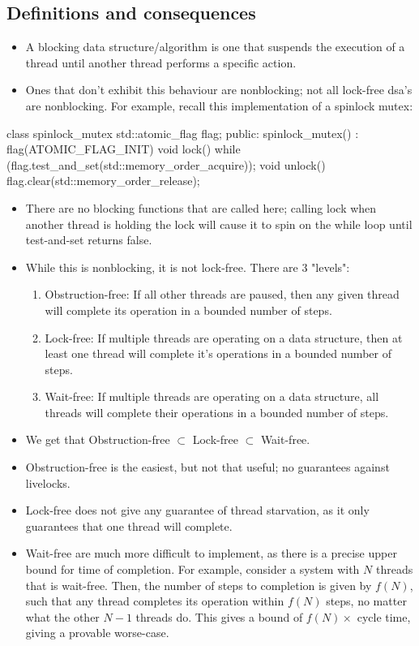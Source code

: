 \documentclass[11pt, a4paper]{article}
\theoremstyle{definition}
\theoremstyle{remark}
\begin{document}
\subsection{Definitions and consequences}
\begin{itemize}
    \item A blocking data structure/algorithm is one that suspends the execution of a thread until another thread performs a specific action.
    \item Ones that don't exhibit this behaviour are nonblocking; not all lock-free dsa's are nonblocking. For example, recall this implementation of a spinlock mutex:
\end{itemize}
\begin{cppcode}
class spinlock_mutex {
    std::atomic_flag flag;
public:
    spinlock_mutex() : flag(ATOMIC_FLAG_INIT) {}
    void lock() {
        while (flag.test_and_set(std::memory_order_acquire));
    }
    void unlock() {
        flag.clear(std::memory_order_release);
    }
}
\end{cppcode}
\begin{itemize}
    \item There are no blocking functions that are called here; calling lock when another thread is holding the lock will cause it to spin on the while loop until test-and-set returns false.
    \item While this is nonblocking, it is not lock-free. There are 3 "levels":
    \begin{enumerate}
        \item Obstruction-free: If all other threads are paused, then any given thread will complete its operation in a bounded number of steps.
        \item Lock-free: If multiple threads are operating on a data structure, then at least one thread will complete it's operations in a bounded number of steps.
        \item Wait-free: If multiple threads are operating on a data structure, all threads will complete their operations in a bounded number of steps.
    \end{enumerate}
        \item We get that Obstruction-free $\subset$ Lock-free $\subset$ Wait-free.
        \item Obstruction-free is the easiest, but not that useful; no guarantees against livelocks.
        \item Lock-free does not give any guarantee of thread starvation, as it only guarantees that one thread will complete.
        \item Wait-free are much more difficult to implement, as there is a precise upper bound for time of completion. For example, consider a system with $N$ threads that is wait-free. Then, the number of steps to completion is given by $f(N)$, such that any thread completes its operation within $f(N)$ steps, no matter what the other $N-1$ threads do. This gives a bound of $f(N) \times $ cycle time, giving a provable worse-case.
\end{itemize}
\newpage
\end{document}
